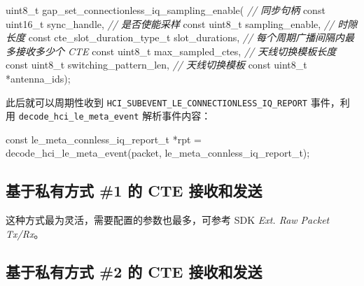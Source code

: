 \documentclass[
  12pt,
]{book}
\newenvironment{Shaded}{\begin{snugshade}}{\end{snugshade}}
\newcommand{\CommentTok}[1]{\textcolor[rgb]{0.56,0.35,0.01}{\textit{#1}}}
\newcommand{\DataTypeTok}[1]{\textcolor[rgb]{0.13,0.29,0.53}{#1}}
\newcommand{\NormalTok}[1]{#1}
\begin{document}
\begin{Shaded}
\begin{Highlighting}[]
\DataTypeTok{uint8_t}\NormalTok{ gap_set_connectionless_iq_sampling_enable(}
  \CommentTok{// 同步句柄}
  \DataTypeTok{const} \DataTypeTok{uint16_t}\NormalTok{      sync_handle,}
  \CommentTok{// 是否使能采样}
  \DataTypeTok{const} \DataTypeTok{uint8_t}\NormalTok{       sampling_enable,}
  \CommentTok{// 时隙长度}
  \DataTypeTok{const}\NormalTok{ cte_slot_duration_type_t slot_durations,}
  \CommentTok{// 每个周期广播间隔内最多接收多少个 CTE}
  \DataTypeTok{const} \DataTypeTok{uint8_t}\NormalTok{       max_sampled_ctes,}
  \CommentTok{// 天线切换模板长度}
  \DataTypeTok{const} \DataTypeTok{uint8_t}\NormalTok{       switching_pattern_len,}
  \CommentTok{// 天线切换模板}
  \DataTypeTok{const} \DataTypeTok{uint8_t}\NormalTok{      *antenna_ids);}
\end{Highlighting}
\end{Shaded}

此后就可以周期性收到 \texttt{HCI\_SUBEVENT\_LE\_CONNECTIONLESS\_IQ\_REPORT} 事件，利用 \texttt{decode\_hci\_le\_meta\_event}
解析事件内容：

\begin{Shaded}
\begin{Highlighting}[]
\DataTypeTok{const}\NormalTok{ le_meta_connless_iq_report_t *rpt =}
\NormalTok{  decode_hci_le_meta_event(packet, le_meta_connless_iq_report_t);}
\end{Highlighting}
\end{Shaded}

\hypertarget{ux57faux4e8eux79c1ux6709ux65b9ux5f0f-1-ux7684-cte-ux63a5ux6536ux548cux53d1ux9001}{%
\subsection{基于私有方式 \#1 的 CTE 接收和发送}\label{ux57faux4e8eux79c1ux6709ux65b9ux5f0f-1-ux7684-cte-ux63a5ux6536ux548cux53d1ux9001}}

这种方式最为灵活，需要配置的参数也最多，可参考 SDK \emph{Ext. Raw Packet Tx/Rx}。

\hypertarget{ux57faux4e8eux79c1ux6709ux65b9ux5f0f-2-ux7684-cte-ux63a5ux6536ux548cux53d1ux9001}{%
\subsection{基于私有方式 \#2 的 CTE 接收和发送}\label{ux57faux4e8eux79c1ux6709ux65b9ux5f0f-2-ux7684-cte-ux63a5ux6536ux548cux53d1ux9001}}
\end{document}

